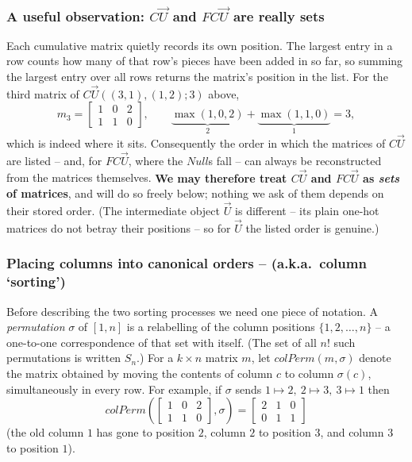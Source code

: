 \subsubsection*{A useful observation: $C\vec U$ and $FC\vec U$ are really sets}

Each cumulative matrix quietly records its own position.  The largest entry in a
row counts how many of that row's pieces have been added in so far, so summing the
largest entry over all rows returns the matrix's position in the list.  For the
third matrix of $C\vec U((3,1),(1,2);3)$ above,
\[
m_3=\begin{bmatrix}1&0&2\\1&1&0\end{bmatrix},
\qquad
\underbrace{\max(1,0,2)}_{2}+\underbrace{\max(1,1,0)}_{1}=3,
\]
which is indeed where it sits.  Consequently the order in which the matrices of
$C\vec U$ are listed -- and, for $FC\vec U$, where the $Null$s fall -- can always be
reconstructed from the matrices themselves.  \textbf{We may therefore treat
$C\vec U$ and $FC\vec U$ as \emph{sets} of matrices}, and will do so freely below;
nothing we ask of them depends on their stored order.  (The intermediate object
$\vec U$ is different -- its plain one-hot matrices do not betray their positions --
so for $\vec U$ the listed order is genuine.)

\subsubsection{Placing columns into canonical orders -- (a.k.a.~column `sorting')}
\label{subsec:sorting}

\label{def:colperm}Before describing the two sorting processes we need one piece of notation.  A
\emph{permutation} $\sigma$ of $[1,n]$ is a relabelling of the column positions
$\{1,2,\ldots,n\}$ -- a one-to-one correspondence of that set with itself.  (The set
of all $n!$ such permutations is written $S_n$.)  For a
$k\times n$ matrix $m$, let $colPerm(m,\sigma)$ denote the matrix obtained by moving
the contents of column $c$ to column $\sigma(c)$, simultaneously in every row.  For
example, if $\sigma$ sends $1\mapsto2,\ 2\mapsto3,\ 3\mapsto1$ then
$$
colPerm\left(\begin{bmatrix}1&0&2\\1&1&0\end{bmatrix},\sigma\right)
=\begin{bmatrix}2&1&0\\0&1&1\end{bmatrix}
$$
(the old column $1$ has gone to position $2$, column $2$ to position $3$, and column
$3$ to position $1$).

